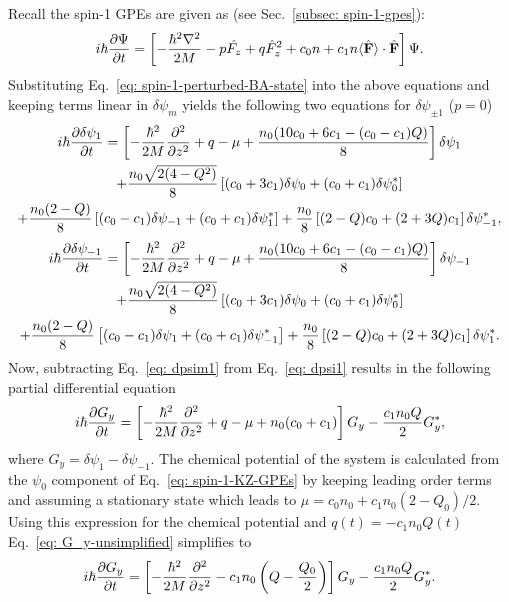 Recall the spin-1 GPEs are given as (see Sec.~\ref{subsec: spin-1-gpes}):
\begin{align}\label{eq: spin-1-KZ-GPEs}
    i\hbar\pdv{\Psi}{t} = \left[ -\frac{\hbar^2\nabla^2}{2M}
    -p\hat{F_z} + q\hat{F}_z^2 +c_0n +c_1n\langle \hat{\vb{F}}\rangle
    \cdot \hat{\vb{F}}\right]\Psi.
\end{align}
Substituting Eq.~\eqref{eq: spin-1-perturbed-BA-state} into the above equations
and keeping terms linear in \(\delta\psi_m\) yields the following two
equations for \(\delta\psi_{\pm 1}\) (\(p=0\))
\begin{multline}\label{eq: dpsi1}
    i\hbar\pdv{\delta\psi_1}{t} = \left[-\frac{\hbar^2}{2M}\pdv[2]{}{z}+q-\mu
    + \frac{n_0(10c_0+6c_1-(c_0-c_1)Q)}{8}\right]\delta\psi_1 \\
    + \frac{n_0\sqrt{2(4-Q^2)}}{8}\left[
        (c_0 + 3c_1)\delta\psi_0
        + (c_0+c_1)\delta\psi_0^*
    \right] \\
    + \frac{n_0(2-Q)}{8}\left[(c_0-c_1)\delta\psi_{-1}
    + (c_0+c_1)\delta\psi_1^*\right]
    + \frac{n_0}{8}\left[(2-Q)c_0 + (2+3Q)c_1\right]\delta\psi_{-1}^*,
\end{multline}
\begin{multline}\label{eq: dpsim1}
    i\hbar\pdv{\delta\psi_{-1}}{t} = \left[-\frac{\hbar^2}{2M}\pdv[2]{}{z}+q-\mu
    + \frac{n_0(10c_0+6c_1-(c_0-c_1)Q)}{8}\right]\delta\psi_{-1} \\
    + \frac{n_0\sqrt{2(4-Q^2)}}{8}\left[
        (c_0 + 3c_1)\delta\psi_0
        + (c_0+c_1)\delta\psi_0^*
    \right] \\
    + \frac{n_0(2-Q)}{8}\left[(c_0-c_1)\delta\psi_{1}
    + (c_0+c_1)\delta\psi_{-1}^*\right]
    + \frac{n_0}{8}\left[(2-Q)c_0 + (2+3Q)c_1\right]\delta\psi_{1}^*.
\end{multline}
Now, subtracting Eq.~\eqref{eq: dpsim1} from Eq.~\eqref{eq: dpsi1} results in
the following partial differential equation
\begin{align}\label{eq: G_y-unsimplified}
    i\hbar\pdv{G_y}{t}= \left[ -\frac{\hbar^2}{2M}\pdv[2]{}{z}+q
    -\mu+n_0(c_0+c_1)\right]G_y
    -\frac{c_1n_0Q}{2}G_y^*,
\end{align}
where \(G_y = \delta\psi_1 - \delta\psi_{-1}\).
The chemical potential of the system is calculated from the \(\psi_0\)
component of Eq.~\eqref{eq: spin-1-KZ-GPEs} by keeping leading order terms and
assuming a stationary state which leads to
\(\mu=c_0n_0 + c_1n_0(2 - Q_0)/2\).
Using this expression for the chemical potential and \(q(t) = -c_1n_0Q(t)\)
Eq.~\eqref{eq: G_y-unsimplified} simplifies to
\begin{align}\label{eq: G_y-simplified}
    i\hbar\pdv{G_y}{t} = \left[ -\frac{\hbar^2}{2M}\pdv[2]{}{z}
    -c_1n_0\left(Q-\frac{Q_0}{2}\right)\right]G_y
    - \frac{c_1n_0Q}{2}G_y^*.
\end{align}

